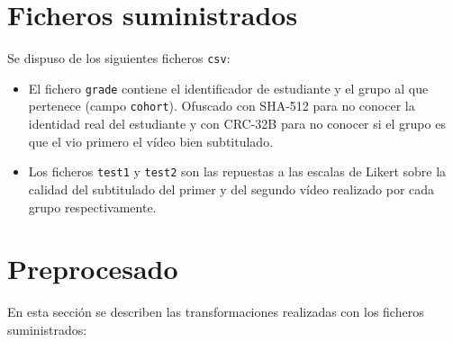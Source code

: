 \documentclass[
  12pt,
  a4paper,
  extrafontsizes,
  onecolumn,
  openright,
  table]{memoir}
\providecommand{\tightlist}{%
  \setlength{\itemsep}{0pt}\setlength{\parskip}{0pt}}\usepackage{longtable,booktabs,array}
\begin{document}
\hypertarget{ficheros-suministrados}{%
\section{Ficheros suministrados}\label{ficheros-suministrados}}

Se dispuso de los siguientes ficheros \texttt{csv}:

\begin{itemize}
\tightlist
\item
  El fichero \texttt{grade} contiene el identificador de estudiante y el
  grupo al que pertenece (campo \texttt{cohort}). Ofuscado con SHA-512
  para no conocer la identidad real del estudiante y con CRC-32B para no
  conocer si el grupo es que el vio primero el vídeo bien subtitulado.
\item
  Los ficheros \texttt{test1} y \texttt{test2} son las repuestas a las
  escalas de Likert sobre la calidad del subtitulado del primer y del
  segundo vídeo realizado por cada grupo respectivamente.
\end{itemize}

\hypertarget{sec-preprocesado}{%
\section{Preprocesado}\label{sec-preprocesado}}

En esta sección se describen las transformaciones realizadas con los
ficheros suministrados:
\end{document}
